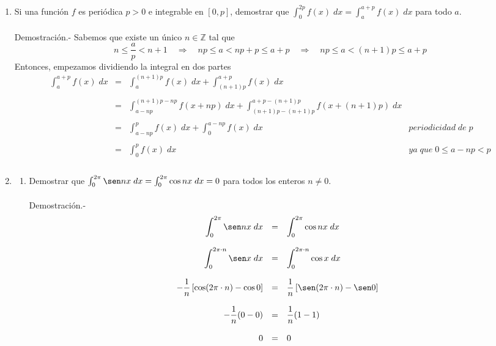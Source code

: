 \begin{enumerate}
\item Si una función $f$ es periódica $p>0$ e integrable en $[0,p]$, demostrar que $\int_{0}^{2p} f(x)\; dx = \int_a^{a+p} f(x)\; dx$ para todo $a$.\\\\
    Demostración.-\; Sabemos que existe un único $n\in \mathbb{Z}$ tal que 
    $$n\leq \dfrac{a}{p}<n+1 \quad \Longrightarrow \quad np\leq a < np + p \leq a + p \quad \Longrightarrow \quad np\leq a < (n+1)p\leq a+p$$
    Entonces, empezamos dividiendo la integral en dos partes\\ 
    $$\begin{array}{rcll}
	\displaystyle\int_{a}^{a+p}f(x) \; dx&=&\displaystyle\int_{a}^{(n+1)p}f(x) \; dx + \displaystyle\int_{(n+1)p}^{a+p}f(x) \; dx &\\\\
					     &=&\displaystyle\int_{a-np}^{(n+1)p-np} f(x+np) \; dx + \displaystyle\int_{(n+1)p-(n+1)p}^{a+p-(n+1)p} f(x+(n+1)p)  \; dx &\\\\
					     &=&\displaystyle\int_{a-np}^{p} f(x) \; dx + \displaystyle\int_{0}^{a-np} f(x) \; dx & periodicidad \; de \; p\\\\
					     &=&\displaystyle\int_{0}^{p} f(x) \; dx & ya \; que\;  0\leq a-np<p\\\\
    \end{array}$$

\item
\begin{enumerate}[\bfseries (a)]

    \item Demostrar que $\int_0^{2\pi} \sen nx \;dx = \int_0^{2\pi} \cos nx \; dx = 0$ para todos los enteros $n\neq 0$.\\\\
	Demostración.-\; 
	$$\begin{array}{rcl}
	    \displaystyle\int_0^{2\pi} \sen nx\; dx&=&\displaystyle\int_0^{2\pi}\cos nx\; dx\\\\
	    \displaystyle\int_0^{2\pi\cdot n}\sen x \; dx&=&\displaystyle\int_0^{2\pi\cdot n}\cos x \; dx\\\\
	    -\dfrac{1}{n}\left[\cos(2\pi\cdot n)-\cos 0\right]&=&\dfrac{1}{n} \left[\sen(2\pi\cdot n) - \sen 0\right]\\\\
	    -\dfrac{1}{n}(0-0)&=&\dfrac{1}{n}(1-1)\\\\
	    0&=&0\\\\
	\end{array}$$


\end{enumerate}
\end{enumerate}
